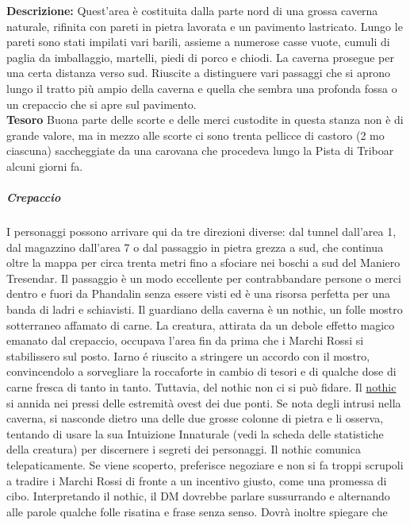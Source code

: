 \documentclass{article}
\begin{document}
    \textbf{Descrizione:} Quest’area è costituita dalla parte nord di una grossa
    caverna naturale, rifinita con pareti in pietra lavorata e un
    pavimento lastricato. Lungo le pareti sono stati impilati vari
    barili, assieme a numerose casse vuote, cumuli di paglia da
    imballaggio, martelli, piedi di porco e chiodi.
    La caverna prosegue per una certa distanza verso sud. Riuscite
    a distinguere vari passaggi che si aprono lungo il tratto più
    ampio della caverna e quella che sembra una profonda fossa o
    un crepaccio che si apre sul pavimento.\\
    \textbf{Tesoro} Buona parte delle scorte e delle merci custodite in questa
    stanza non è di grande valore, ma in mezzo alle scorte ci
    sono trenta pellicce di castoro (2 mo ciascuna) saccheggiate
    da una carovana che procedeva lungo la Pista di Triboar
    alcuni giorni fa.
    \subparagraph{Crepaccio} I personaggi possono arrivare qui da tre direzioni diverse:
    dal tunnel dall'area 1, dal magazzino dall’area 7 o dal
    passaggio in pietra grezza a sud, che continua oltre la mappa
    per circa trenta metri fino a sfociare nei boschi a sud del
    Maniero Tresendar. Il passaggio è un modo eccellente per
    contrabbandare persone o merci dentro e fuori da Phandalin
    senza essere visti ed è una risorsa perfetta per una banda di
    ladri e schiavisti.
    Il guardiano della caverna è un nothic, un folle mostro
    sotterraneo affamato di carne. La creatura, attirata da un
    debole effetto magico emanato dal crepaccio, occupava l'area
    fin da prima che i Marchi Rossi si stabilissero sul posto. Iarno
    é riuscito a stringere un accordo con il mostro, convincendolo
    a sorvegliare la roccaforte in cambio di tesori e di qualche
    dose di carne fresca di tanto in tanto. Tuttavia, del nothic non
    ci si può fidare.
    Il \hyperlink{nothic}{nothic} si annida nei pressi delle estremità ovest dei
    due ponti. Se nota degli intrusi nella caverna, si nasconde
    dietro una delle due grosse colonne di pietra e li osserva,
    tentando di usare la sua Intuizione Innaturale (vedi la scheda
    delle statistiche della creatura) per discernere i segreti
    dei personaggi.
    Il nothic comunica telepaticamente. Se viene scoperto,
    preferisce negoziare e non si fa troppi scrupoli a tradire
    i Marchi Rossi di fronte a un incentivo giusto, come una
    promessa di cibo. Interpretando il nothic, il DM dovrebbe
    parlare sussurrando e alternando alle parole qualche folle
    risatina e frase senza senso. Dovrà inoltre spiegare che
\end{document}
